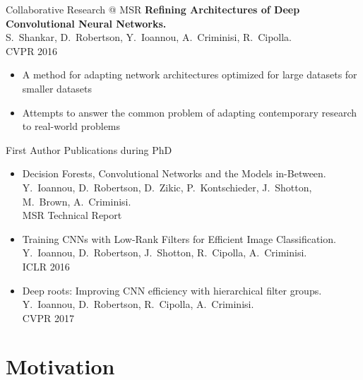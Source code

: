 \documentclass[t,xcolor=dvipsnames]{beamer}
\begin{document}
\begin{frame}{Collaborative Research @ MSR}
\textbf{Refining Architectures of Deep Convolutional Neural Networks.}\\{\footnotesize S.\ Shankar, D.\ Robertson, Y.\ Ioannou, A.\ Criminisi, R.\ Cipolla.\\CVPR 2016}
\begin{itemize}
    \item A method for adapting network architectures optimized for large datasets for smaller datasets
    \item Attempts to answer the common problem of adapting contemporary research to real-world problems
\end{itemize}
\end{frame}

\begin{frame}{First Author Publications during PhD}
\begin{itemize}
    \item Decision Forests, Convolutional Networks and the Models in-Between.\\{\footnotesize Y.\ Ioannou, D.\ Robertson, D.\ Zikic, P.\ Kontschieder, J.\ Shotton, M.\ Brown, A.\ Criminisi.\\MSR Technical Report} 
    \item Training CNNs with Low-Rank Filters for Efficient Image Classification.\\{\footnotesize Y.\ Ioannou, D.\ Robertson, J.\ Shotton, R.\ Cipolla, A.\ Criminisi. \\ICLR 2016}
    \item Deep roots: Improving CNN efficiency with hierarchical filter groups.\\{\footnotesize Y.\ Ioannou, D.\ Robertson, R.\ Cipolla, A.\ Criminisi.\\CVPR 2017}
    
\end{itemize}
\end{frame}

\section{Motivation}

\end{document}
